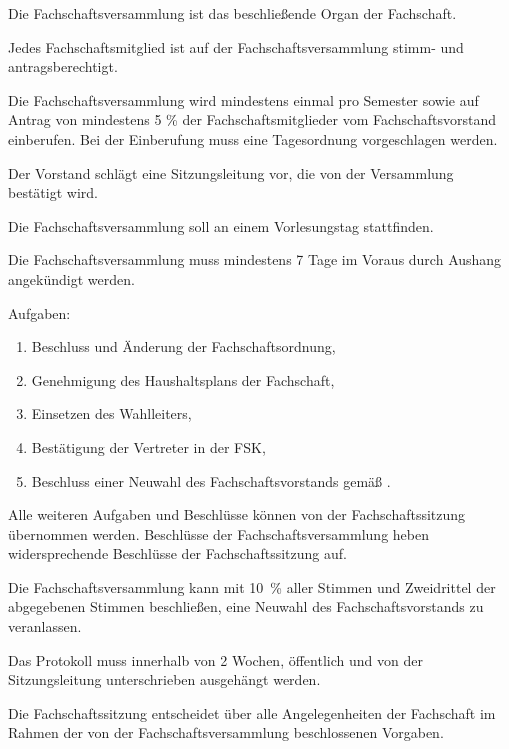 \documentclass[a4paper,parskip=half,numbers=noenddot]{scrartcl}
\begin{document}
\begin{contract}
\label{fachschaft:vv}

Die Fachschaftsversammlung ist das beschließende Organ der Fachschaft.

Jedes Fachschaftsmitglied ist auf der Fachschaftsversammlung stimm- und antragsberechtigt.

Die Fachschaftsversammlung wird mindestens einmal pro Semester sowie auf Antrag von mindestens 5 \% der Fachschaftsmitglieder vom Fachschaftsvorstand einberufen. Bei der Einberufung muss eine Tagesordnung vorgeschlagen werden.

Der Vorstand schlägt eine Sitzungsleitung vor, die von der Versammlung bestätigt wird.

Die Fachschaftsversammlung soll an einem Vorlesungstag stattfinden. 

Die Fachschaftsversammlung muss mindestens 7 Tage im Voraus durch Aushang angekündigt werden.

Aufgaben: \label{fachschaft:vv:kompetenzen}
  \begin{enumerate}
  \item Beschluss und Änderung der Fachschaftsordnung,
  \item Genehmigung des Haushaltsplans der Fachschaft, 
  \item Einsetzen des Wahlleiters, \label{fachschaft:vv:wahlleiter}
  \item Bestätigung der Vertreter in der FSK,
  \item Beschluss einer Neuwahl des Fachschaftsvorstands gemäß . \label{fachschaft:vv:kompetenzen:abwahl}
 
  \end{enumerate}

Alle weiteren Aufgaben und Beschlüsse können von der Fachschaftssitzung übernommen werden. Beschlüsse der Fachschaftsversammlung heben widersprechende Beschlüsse der Fachschaftssitzung auf.

Die Fachschaftsversammlung kann mit 10~\% aller Stimmen und Zweidrittel der abgegebenen Stimmen be\-schlie\-ßen, eine Neuwahl des Fach\-schaftsvor\-stands zu veranlassen\label{fachschaft:vv:wahl}.

Das Protokoll muss innerhalb von 2 Wochen, öffentlich und von der Sitzungsleitung unterschrieben ausgehängt werden. 

\label{fs:sitzung}

Die Fachschaftssitzung entscheidet über alle Angelegenheiten der Fachschaft im Rahmen der von der Fachschaftsversammlung beschlossenen Vorgaben. 


\end{contract}
\end{document}

